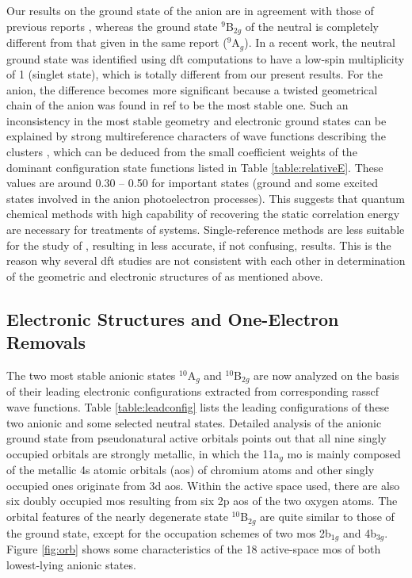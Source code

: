 \begin{refsection}
Our results on the ground state of the anion  are in agreement with those of previous reports \cite{Tono2003B}, whereas the ground state $^9$B$_{2g}$ of the neutral is completely different from that given in the same report ($^9$A$_g$).\cite{Tono2003B} In a recent work, \cite{GutsevCr2On} the neutral ground state was identified using \acrshort{dft} computations to have a low-spin multiplicity of 1 (singlet state), which is totally different from our present results. For the anion, the difference becomes more significant because a twisted geometrical chain of the anion  was found in ref  to be the most stable one. \cite{GutsevCr2On} Such an inconsistency in the most stable geometry and electronic ground states can be explained by strong multireference characters of wave functions describing the clusters , which can be deduced from the small coefficient weights of the dominant configuration state functions listed in Table \ref{table:relativeE}. These values are around 0.30 -- 0.50 for important states (ground and some excited states involved in the anion photoelectron processes). This suggests that quantum chemical methods with high capability of recovering the static correlation energy are necessary for treatments of  systems. Single-reference methods are less suitable for the study of , resulting in less accurate, if not confusing, results. This is the reason why several \acrshort{dft} studies are not consistent with each other in determination of the geometric and electronic structures of  as mentioned above.  



\subsection{Electronic Structures and One-Electron Removals}


The two most stable anionic states $^{10}$A$_g$ and $^{10}$B$_{2g}$ are now analyzed on the basis of their leading electronic configurations extracted from corresponding \acrshort{rasscf} wave functions. Table \ref{table:leadconfig} lists the leading configurations of these two anionic and some selected neutral states. Detailed analysis of the anionic ground state from pseudonatural active orbitals points out that all nine singly occupied orbitals are strongly metallic, in which the 11a$_g$ \acrshort{mo} is mainly composed of the metallic 4s atomic orbitals (\acrshort{ao}s) of chromium atoms and other singly occupied ones originate from 3d \acrshort{ao}s. Within the active space used, there are also six doubly occupied \acrshort{mo}s resulting from six 2p \acrshort{ao}s of the two oxygen atoms. The orbital features of the nearly degenerate state $^{10}$B$_{2g}$ are quite similar to those of the ground state, except for the occupation schemes of two \acrshort{mo}s 2b$_{1g}$ and 4b$_{3g}$. Figure \ref{fig:orb} shows some characteristics of the 18 active-space \acrshort{mo}s of both lowest-lying anionic states.


\end{refsection}
